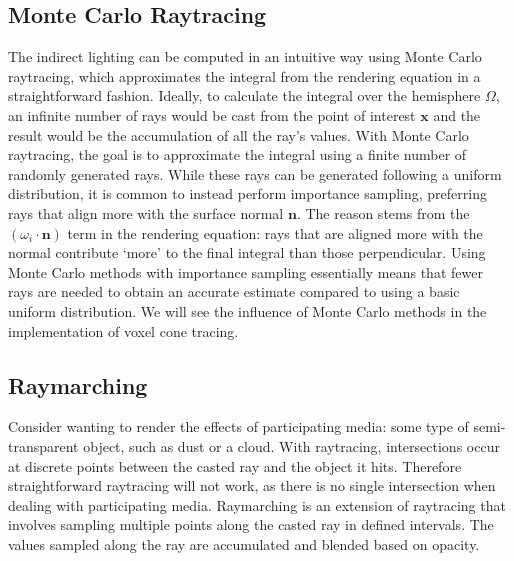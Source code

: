 \subsection{Monte Carlo Raytracing}
The indirect lighting can be computed in an intuitive way using Monte Carlo raytracing, which approximates the integral from the rendering equation in a straightforward fashion. Ideally, to calculate the integral over the hemisphere $\Omega$, an infinite number of rays would be cast from the point of interest $\bm{x}$ and the result would be the accumulation of all the ray's values. With Monte Carlo raytracing, the goal is to approximate the integral using a finite number of randomly generated rays. While these rays can be generated following a uniform distribution, it is common to instead perform importance sampling, preferring rays that align more with the surface normal $\bm{n}$. The reason stems from the $(\omega_i \cdot \bm{n})$ term in the rendering equation: rays that are aligned more with the normal contribute `more' to the final integral than those perpendicular. Using Monte Carlo methods with importance sampling essentially means that fewer rays are needed to obtain an accurate estimate compared to using a basic uniform distribution. We will see the influence of Monte Carlo methods in the implementation of voxel cone tracing.

\subsection{Raymarching}
Consider wanting to render the effects of participating media: some type of semi-transparent object, such as dust or a cloud. With raytracing, intersections occur at discrete points between the casted ray and the object it hits. Therefore straightforward raytracing will not work, as there is no single intersection when dealing with participating media. Raymarching is an extension of raytracing that involves sampling multiple points along the casted ray in defined intervals. The values sampled along the ray are accumulated and blended based on opacity.
